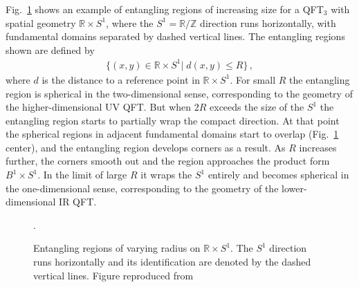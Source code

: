 \documentclass[11 pt]{article}
\def\RR{{\mathds{R}}}
\def\ZZ{{\mathds{Z}}}
\begin{document}
Fig.~\ref{fig:boundary_evolution} shows an example of entangling regions of increasing size for a QFT$_3$ with spatial geometry $\mathbb{R}\times S^1$, where the $S^1=\RR/\ZZ$ direction runs horizontally, with fundamental domains separated by dashed vertical lines.  The entangling regions shown are defined by
\begin{align}\label{eq:region-def}
\{(x,y)\in\mathbb{R}\times S^1|\;d(x,y)\leq R\}\,,
\end{align}
where $d$ is the distance to a reference point in $\RR\times S^1$.
For small $R$ the entangling region is spherical in the two-dimensional sense, corresponding to the geometry of the higher-dimensional UV QFT. But when $2R$ exceeds the size of the $S^1$ the entangling region starts to partially wrap the compact direction. At that point the spherical regions in adjacent fundamental domains start to overlap (Fig.~\ref{fig:boundary_evolution} center),  and the entangling region develops corners as a result. As $R$ increases further, the corners smooth out and the region approaches the product form $B^1\times S^1$. In the limit of large $R$ it wraps the $S^1$ entirely and becomes spherical in the one-dimensional sense, corresponding to the geometry of the lower-dimensional IR QFT.

\begin{figure}
    \centering
\hskip 20mm
\hskip 20mm

    \caption{Entangling regions of varying radius on $\mathbb{R}\times S^1$. The $S^1$ direction runs horizontally and its identification are denoted by the dashed vertical lines. Figure reproduced from \cite{GonzalezLezcano:2022mcd}}.
    \label{fig:boundary_evolution}
\end{figure}
\end{document}
